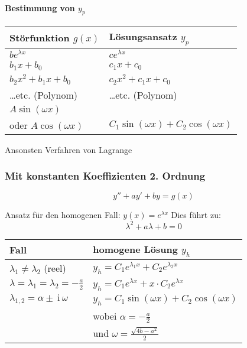 \documentclass[12pt]{article}
\newcommand{\ci}{\:\mathrm{i}\:}
\begin{document}
\begin{multicols*}{3}
					\paragraph{Bestimmung von $y_p$} %
						
						\mbox{}
						\vspace{8pt}
						
						\begin{tabular}{l|l}
							\textbf{Störfunktion $g(x)$} & \textbf{Lösungsansatz $y_p$} \\
							\hline
							$b e^{\lambda x}$ & $c e^{\lambda x}$ \\ [5pt]
							$b_1 x + b_0$ & $c_1 x + c_0$\\ [5pt]
							$b_2 x^2 + b_1 x + b_0$ & $c_2 x^2 + c_1 x + c_0$\\ [5pt]
							\ldots etc. (Polynom) & \ldots etc. (Polynom)\\ [5pt]
							$A \sin (\omega x)$ & \\
							oder $A \cos (\omega x)$ & $C_1 \sin (\omega x) + C_2 \cos (\omega x)$
						\end{tabular}
						
						Ansonsten Verfahren von Lagrange
				\subsubsection{Mit konstanten Koeffizienten 2. Ordnung} %
					\[
						y'' + ay' + by = g(x)
					\]
					
					Ansatz für den homogenen Fall: $y(x) = e^{\lambda x}$
					Dies führt zu:
					\[
						\lambda^2 + a \lambda + b = 0
					\]
					
					\begin{tabular}{l|l}
						Fall & homogene Lösung $y_h$ \\
						\hline
						$\lambda_1 \neq \lambda_2$ (reel) & $y_h = C_1 e^{\lambda_1 x} + C_2 e^{\lambda_2 x}$ \\ [5pt]
						$\lambda = \lambda_1 = \lambda_2 = -\frac{a}{2}$ & $y_h = C_1 e^{\lambda x} + x \cdot C_2 e^{\lambda x}$ \\ [5pt]
						$\lambda_{1,2} = \alpha \pm \ci \omega$ & $y_h = C_1 \sin (\omega x) + C_2 \cos (\omega x)$ \\ [2pt]
						 & wobei $\alpha = -\frac{a}{2}$ \\ [2pt]
						 & und $\omega = \frac{\sqrt{4b-a^2}}{2}$
					\end{tabular}
					

\end{multicols*}
\end{document}
